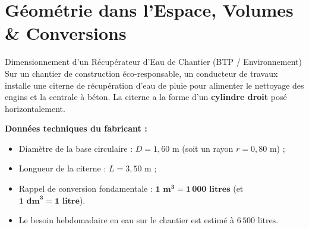 \chapter{Géométrie dans l'Espace, Volumes \& Conversions}

\begin{activite}{Dimensionnement d'un Récupérateur d'Eau de Chantier (BTP / Environnement)}
Sur un chantier de construction éco-responsable, un conducteur de travaux installe une citerne de récupération d'eau de pluie pour alimenter le nettoyage des engins et la centrale à béton.
La citerne a la forme d'un \textbf{cylindre droit} posé horizontalement.

\vspace{1mm}
\begin{center}
\begin{tcolorbox}[colback=amber!10, colframe=amber!80!black, arc=4pt, boxrule=0.8pt, left=8pt, right=8pt, top=4pt, bottom=4pt]
\sffamily\footnotesize
\textbf{Données techniques du fabricant :}
\begin{itemize}[leftmargin=1.5em, itemsep=1pt]
    \item Diamètre de la base circulaire : $D = 1{,}60\text{ m}$ (soit un rayon $r = 0{,}80\text{ m}$) ;
    \item Longueur de la citerne : $L = 3{,}50\text{ m}$ ;
    \item Rappel de conversion fondamentale : $\mathbf{1\text{ m}^3 = 1\,000\text{ litres}}$ (et $\mathbf{1\text{ dm}^3 = 1\text{ litre}}$).
    \item Le besoin hebdomadaire en eau sur le chantier est estimé à \textbf{$6\,500\text{ litres}$}.
\end{itemize}
\end{tcolorbox}
\end{center}

\vspace{1mm}
\noindent
\begin{minipage}[c]{0.48\linewidth}
\centering
{}
\end{minipage}
\end{activite}
